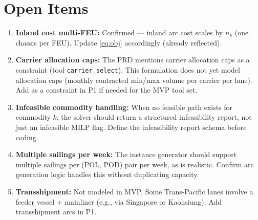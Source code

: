 \documentclass[11pt,a4paper]{article}
\theoremstyle{definition}
\begin{document}
\section{Open Items}

\begin{enumerate}
  \item \textbf{Inland cost multi-FEU:} Confirmed --- inland arc cost scales by $n_k$
        (one chassis per FEU). Update \eqref{eq:obj} accordingly (already reflected).

  \item \textbf{Carrier allocation caps:} The PRD mentions carrier allocation caps as a
        constraint (tool \texttt{carrier\_select}). This formulation does not yet model
        allocation caps (monthly contracted min/max volume per carrier per lane). Add
        as a constraint in P1 if needed for the MVP tool set.

  \item \textbf{Infeasible commodity handling:} When no feasible path exists for commodity
        $k$, the solver should return a structured infeasibility report, not just an
        infeasible MILP flag. Define the infeasibility report schema before coding.

  \item \textbf{Multiple sailings per week:} The instance generator should support multiple
        sailings per (POL, POD) pair per week, as is realistic. Confirm arc generation
        logic handles this without duplicating capacity.

  \item \textbf{Transshipment:} Not modeled in MVP. Some Trans-Pacific lanes involve a
        feeder vessel + mainliner (e.g., via Singapore or Kaohsiung). Add transshipment
        arcs in P1.
\end{enumerate}
\end{document}

